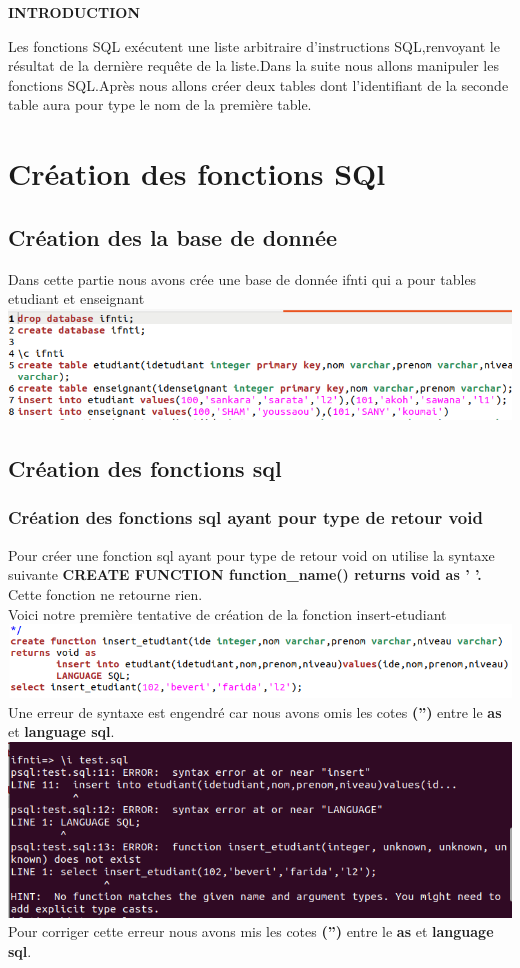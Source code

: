 \documentclass[12pt,b5paper]{article}
\author{sankara sarata DEGBEBIAN Aïmane}
\begin{document}
\begin{center}
\textbf{INTRODUCTION}\\
\end{center}
Les fonctions SQL exécutent une liste arbitraire d'instructions SQL,renvoyant le résultat de la dernière requête de la liste.Dans la suite nous allons manipuler les fonctions SQL.Après nous allons créer deux tables dont l'identifiant de la seconde table  aura pour type le nom de la première table.
\section{Création des fonctions SQl}
\subsection{Création des la base de donnée}
Dans cette partie nous avons crée une base de donnée  ifnti qui a pour tables etudiant et enseignant\\

\includegraphics[scale=0.5]{ifnti}
\subsection{Création des fonctions sql}
\subsubsection{Création des fonctions sql ayant pour type de retour void}
Pour créer une fonction sql ayant pour type de retour void on utilise la syntaxe suivante \textbf{CREATE FUNCTION 	function\_name() returns void as ' '.} Cette fonction ne retourne rien.\\
Voici notre première tentative de création de la fonction insert-etudiant\\ 
\includegraphics[scale=0.5]{er1}
Une erreur de syntaxe est engendré car nous avons omis les cotes \textbf{('')} entre le \textbf{as} et \textbf{language sql}. 
\newpage
\includegraphics[scale=0.5]{erreur_insert_etudiant}\\
Pour corriger cette erreur nous avons mis les cotes \textbf{('')} entre le \textbf{as} et \textbf{language sql}.
\end{document}
